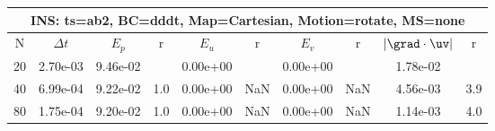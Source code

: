 
\begin{tabular}{|c|c|c|c|c|c|c|c|c|c|} \hline
 \multicolumn{10}{|c|}{INS: ts=ab2, BC=dddt, Map=Cartesian, Motion=rotate, MS=none } \\ \hline 
     N  &   $\Delta t$ & $E_p$   &  r  &   $E_u$   &   r    &   $E_v$   & r   &  $|\grad\cdot\uv|$  & r   \\ \hline 
  20   &  2.70e-03  &   9.46e-02  &        &   0.00e+00  &        &   0.00e+00  &        &   1.78e-02  &        \\ 
  40   &  6.99e-04  &   9.22e-02  & 1.0  &   0.00e+00  & NaN  &   0.00e+00  & NaN  &   4.56e-03  & 3.9  \\ 
  80   &  1.75e-04  &   9.20e-02  & 1.0  &   0.00e+00  & NaN  &   0.00e+00  & NaN  &   1.14e-03  & 4.0  \\ 
 \hline 
\end{tabular}
